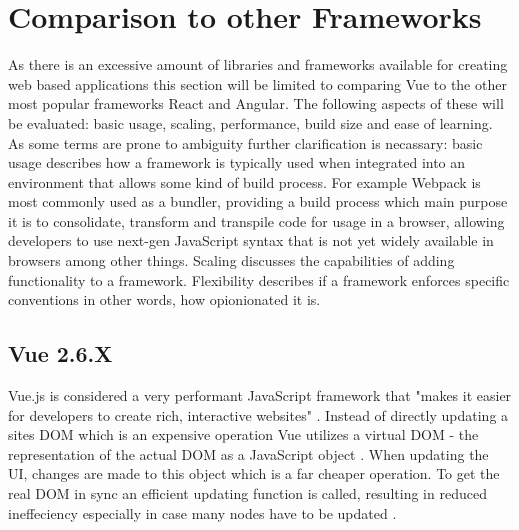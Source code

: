 \section{Comparison to other Frameworks}
As there is an excessive amount of libraries and frameworks available for creating web based applications this section will be limited to comparing Vue to the other most popular frameworks React and Angular. The following aspects of these will be evaluated: basic usage, scaling, performance, build size and ease of learning. As some terms are prone to ambiguity further clarification is necassary: basic usage describes how a framework is typically used when integrated into an environment that allows some kind of build process. For example Webpack is most commonly used as a bundler, providing a build process which main purpose it is to consolidate, transform and transpile code for usage in a browser, allowing developers to use next-gen JavaScript syntax that is not yet widely available in browsers among other things. Scaling discusses the capabilities of adding functionality to a framework. Flexibility describes if a framework enforces specific conventions in other words, how opionionated it is.

\subsection{Vue 2.6.X}
Vue.js is considered a very performant JavaScript framework that "makes it easier for developers to create rich, interactive websites" \cite{macrae2018vue}. Instead of directly updating a sites \gls{DOM} which is an expensive operation Vue utilizes a virtual DOM \cite{ComparisonVue:online} - the representation of the actual DOM as a JavaScript object \cite{WhatIsVirtualDom:online}. When updating the UI, changes are made to this object which is a far cheaper operation. To get the real DOM in sync an efficient updating function is called, resulting in reduced ineffeciency especially in case many nodes have to be updated \cite{WhatIsVirtualDom:online}.

